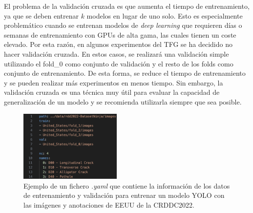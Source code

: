 El problema de la validación cruzada es que aumenta el tiempo de entrenamiento, ya que se deben entrenar $k$ modelos en lugar de uno solo. Esto es especialmente problemático cuando se entrenan modelos de \textit{deep learning} que requieren días o semanas de entrenamiento con GPUs de alta gama, las cuales tienen un coste elevado. Por esta razón, en algunos experimentos del TFG se ha decidido no hacer validación cruzada. En estos casos, se realizará una validación simple utilizando el fold\_0 como conjunto de validación y el resto de los folds como conjunto de entrenamiento. De esta forma, se reduce el tiempo de entrenamiento y se pueden realizar más experimentos en menos tiempo. Sin embargo, la validación cruzada es una técnica muy útil para evaluar la capacidad de generalización de un modelo y se recomienda utilizarla siempre que sea posible.

\begin{figure}[H]
    \centering
    \includegraphics[width=0.45\textwidth]{img/yaml_example.png}
    \caption{Ejemplo de un fichero \textit{.yaml} que contiene la información de los datos de entrenamiento y validación para entrenar un modelo YOLO con las imágenes y anotaciones de EEUU de la CRDDC2022.}
    \label{fig:yaml_example}
\end{figure}

